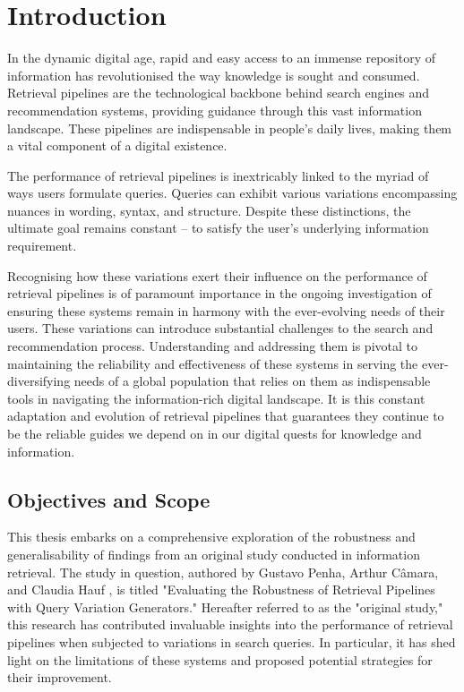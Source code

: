 \chapter{Introduction}
In the dynamic digital age, rapid and easy access to an immense repository of information has revolutionised the way knowledge is sought and consumed. Retrieval pipelines are the technological backbone behind search engines and recommendation systems, providing guidance through this vast information landscape. These pipelines are indispensable in people's daily lives, making them a vital component of a digital existence.

The performance of retrieval pipelines is inextricably linked to the myriad of ways users formulate queries. Queries can exhibit various variations encompassing nuances in wording, syntax, and structure. Despite these distinctions, the ultimate goal remains constant – to satisfy the user's underlying information requirement.

Recognising how these variations exert their influence on the performance of retrieval pipelines is of paramount importance in the ongoing investigation of ensuring these systems remain in harmony with the ever-evolving needs of their users. These variations can introduce substantial challenges to the search and recommendation process. Understanding and addressing them is pivotal to maintaining the reliability and effectiveness of these systems in serving the ever-diversifying needs of a global population that relies on them as indispensable tools in navigating the information-rich digital landscape. It is this constant adaptation and evolution of retrieval pipelines that guarantees they continue to be the reliable guides we depend on in our digital quests for knowledge and information.

\section{Objectives and Scope}
This thesis embarks on a comprehensive exploration of the robustness and generalisability of findings from an original study conducted in information retrieval. The study in question, authored by Gustavo Penha, Arthur Câmara, and Claudia Hauf \cite{penha2022}, is titled "Evaluating the Robustness of Retrieval Pipelines with Query Variation Generators." Hereafter referred to as the "original study," this research has contributed invaluable insights into the performance of retrieval pipelines when subjected to variations in search queries. In particular, it has shed light on the limitations of these systems and proposed potential strategies for their improvement.

